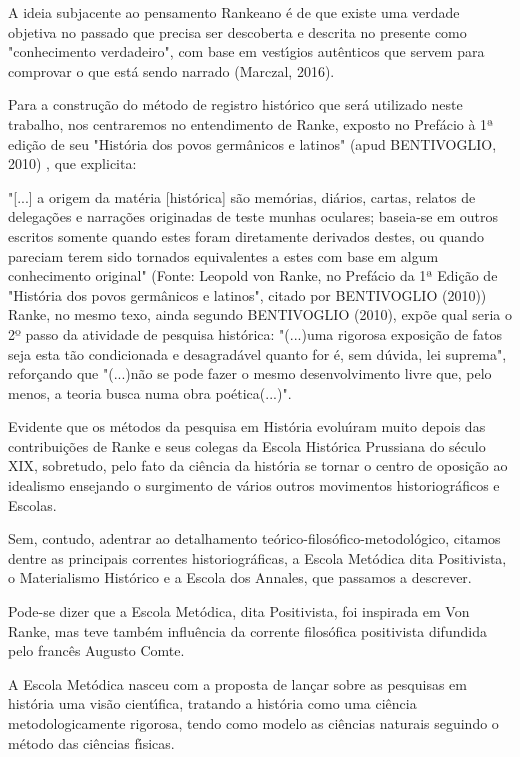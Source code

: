 \documentclass[
12pt,		%
openright,	%
twoside,  %
a4paper,			%
chapter=TITLE,		%
english,			%
french,				%
spanish,			%
brazil				%
]{USPSC-classe/USPSC}
\begin{document}
A ideia subjacente ao pensamento Rankeano \'e de que existe uma verdade objetiva no passado que precisa ser descoberta e descrita no presente como "conhecimento verdadeiro", com base em vest\'{\i}gios aut\^enticos que servem para comprovar o que est\'a sendo narrado (Marczal, 2016).


Para a constru\c{c}\~ao do m\'etodo de registro hist\'orico que ser\'a utilizado neste trabalho, nos centraremos no entendimento de Ranke, exposto no Pref\'acio \`a 1ª edi\c{c}\~ao de seu "Hist\'oria dos povos germ\^anicos e latinos"  (apud BENTIVOGLIO, 2010) , que explicita:


"[...] a origem da mat\'eria [hist\'orica] s\~ao mem\'orias, di\'arios, cartas, relatos de delega\c{c}\~oes e narra\c{c}\~oes originadas de teste munhas oculares; baseia-se em outros escritos somente quando estes foram diretamente derivados destes, ou quando pareciam terem sido tornados equivalentes a estes com base em algum conhecimento original" (Fonte: Leopold von Ranke, no Pref\'acio da 1ª Edi\c{c}\~ao de "Hist\'oria dos povos germ\^anicos e latinos", citado por  BENTIVOGLIO (2010))
Ranke, no mesmo texo, ainda segundo  BENTIVOGLIO (2010), exp\~oe qual seria o 2º passo da atividade de pesquisa hist\'orica: "(...)uma rigorosa exposi\c{c}\~ao de fatos seja esta t\~ao condicionada e desagrad\'avel quanto for \'e, sem d\'uvida, lei suprema", refor\c{c}ando que "(...)n\~ao se pode fazer o mesmo desenvolvimento livre que, pelo menos, a teoria busca numa obra po\'etica(...)".


Evidente que os m\'etodos da pesquisa em Hist\'oria evolu\'{\i}ram muito depois das contribui\c{c}\~oes de Ranke e seus colegas da Escola Hist\'orica Prussiana do s\'eculo XIX, sobretudo, pelo fato da ci\^encia  da hist\'oria se tornar o centro de oposi\c{c}\~ao ao idealismo ensejando o surgimento de v\'arios outros movimentos historiogr\'aficos e Escolas.


Sem, contudo, adentrar ao detalhamento te\'orico-filos\'ofico-metodol\'ogico, citamos dentre as principais correntes historiogr\'aficas, a Escola Met\'odica dita Positivista, o Materialismo Hist\'orico e a Escola dos Annales, que passamos a descrever.


Pode-se dizer que a Escola Met\'odica, dita Positivista, foi inspirada em Von Ranke, mas teve tamb\'em influ\^encia da corrente filos\'ofica positivista difundida pelo franc\^es Augusto Comte.


A Escola Met\'odica nasceu com a proposta de  lan\c{c}ar sobre as pesquisas em hist\'oria uma vis\~ao cient\'{\i}fica, tratando a hist\'oria como uma ci\^encia metodologicamente rigorosa, tendo como modelo as ci\^encias naturais seguindo o m\'etodo das ci\^encias f\'{\i}sicas.
\end{document}
